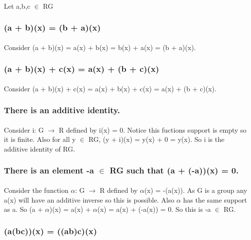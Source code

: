 \documentclass[11pt]{article}
\begin{document}
\paragraph{}
Let a,b,c \(\in\) RG
\subsubsection{(a + b)(x) = (b + a)(x)}
\label{sec:orgfc32976}
\paragraph{}
Consider (a + b)(x) = a(x) + b(x) = b(x) + a(x) = (b + a)(x).
\subsubsection{(a + b)(x) + c(x) = a(x) + (b + c)(x)}
\label{sec:org84dd37d}
\paragraph{}
Consider (a + b)(x) + c(x) = a(x) + b(x) + c(x) = a(x) + (b + c)(x). 
\subsubsection{There is an additive identity.}
\label{sec:org18ca200}
\paragraph{}
Consider i: G \(\to\) R defined by i(x) = 0. Notice this fuctions support is empty so it is finite. Also for all y \(\in\) RG, (y + i)(x) = y(x) + 0 = y(x).
So i is the additive identity of RG.
\subsubsection{There is an element -a \(\in\) RG such that (a + (-a))(x) = 0.}
\label{sec:org567ffc0}
\paragraph{}
Consider the function \(\alpha\): G \(\to\) R defined by \(\alpha\)(x) = -(a(x)). As G is a group any a(x) will have an additive inverse so this is possible. Also \(\alpha\) has the same support as a. So (a + \(\alpha\))(x) = a(x) + \(\alpha\)(x) = a(x) + (-a(x)) = 0. So this is -a \(\in\) RG.
\subsubsection{(a(bc))(x) = ((ab)c)(x)}
\label{sec:org426642f}
\end{document}
